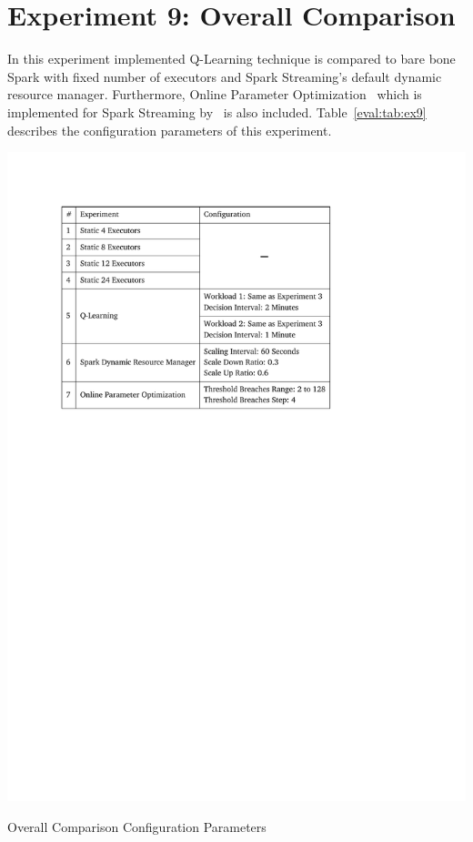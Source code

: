 \section{Experiment 9: Overall Comparison}
In this experiment implemented Q-Learning technique is compared to bare bone Spark with fixed number of executors and Spark Streaming's default dynamic resource manager. Furthermore, Online Parameter Optimization~\cite{Heinze:2015} which is implemented for Spark Streaming by~\textcite{Michal:2017} is also included. Table~\ref{eval:tab:ex9} describes the configuration parameters of this experiment.
\begin{table}[h]
    \includegraphics[clip,trim=2.4cm 17.9cm 6.1cm 2.5cm]{tables/ex9.pdf}
    \centering
    \caption{Overall Comparison Configuration Parameters}
    \label{eval:tab:ex9}
\end{table}

